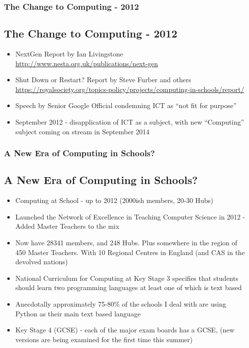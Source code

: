 \documentclass{beamer}
\begin{document}
\begin{frame}
  \frametitle{The Change to Computing - 2012}
  \subsection{The Change to Computing - 2012}

  \begin{itemize}
    
  \item NextGen Report by Ian Livingstone \url{http://www.nesta.org.uk/publications/next-gen}
    
  \item Shut Down or Restart? Report by Steve Furber and others
    \url{https://royalsociety.org/topics-policy/projects/computing-in-schools/report/}
    
  \item Speech by Senior Google Official condemning ICT as ``not fit for purpose''
    
  \item September 2012 - disapplication of ICT as a subject, with new ``Computing'' subject coming on stream in
    September 2014    
  \end{itemize}
\end{frame}

\begin{frame}
  \frametitle{A New Era of Computing in Schools?}
  \subsection{A New Era of Computing in Schools?}
  \begin{itemize}
    
  \item Computing at School - up to 2012 (2000ish members, 20-30 Hubs)
    
  \item Launched the Network of Excellence in Teaching Computer Science in 2012 - Added Master Teachers to the mix
    
  \item Now have 28341 members, and 248 Hubs. Plus somewhere in the region of 450 Master Teachers. With 10 Regional
    Centres in England (and CAS in the devolved nations)
    
  \item National Curriculum for Computing at Key Stage 3 specifies that students should learn two programming languages
    at least one of which is text based
    
  \item Anecdotally approximately 75-80\% of the schools I deal with are using Python as their main text based language
    
  \item Key Stage 4 (GCSE) - each of the major exam boards has a GCSE, (new versions are being examined for the first
    time this summer)
  \end{itemize}
 
\end{frame}
\end{document}
